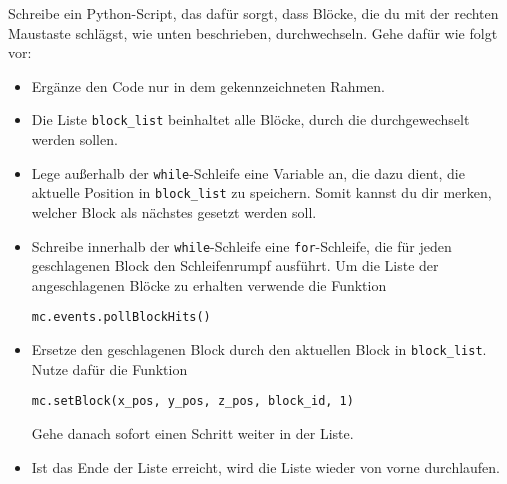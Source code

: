 \large Schreibe ein Python-Script, das dafür sorgt, dass Blöcke, die du mit der rechten Maustaste schlägst, wie unten beschrieben, durchwechseln.
Gehe dafür wie folgt vor:
\begin{itemize}
	\item Ergänze den Code nur in dem gekennzeichneten Rahmen.
	
	\item Die Liste \texttt{block\_list} beinhaltet alle Blöcke, durch die durchgewechselt werden sollen.
	
	\item Lege außerhalb der \texttt{while}-Schleife eine Variable an, die dazu dient, die aktuelle Position in \texttt{block\_list} zu speichern. Somit kannst du dir merken, welcher Block als nächstes gesetzt werden soll.
	
	\item Schreibe innerhalb der \texttt{while}-Schleife eine \texttt{for}-Schleife, die für jeden geschlagenen Block den Schleifenrumpf ausführt. Um die Liste der angeschlagenen Blöcke zu erhalten verwende die Funktion
	\begin{lstlisting}
mc.events.pollBlockHits()
	\end{lstlisting}
		
	\item Ersetze den geschlagenen Block durch den aktuellen Block in \texttt{block\_list}. Nutze dafür die Funktion
	\begin{lstlisting}
mc.setBlock(x_pos, y_pos, z_pos, block_id, 1)
	\end{lstlisting}
	Gehe danach sofort einen Schritt weiter in der Liste.
	
	\item Ist das Ende der Liste erreicht, wird die Liste wieder von vorne durchlaufen.
\end{itemize}